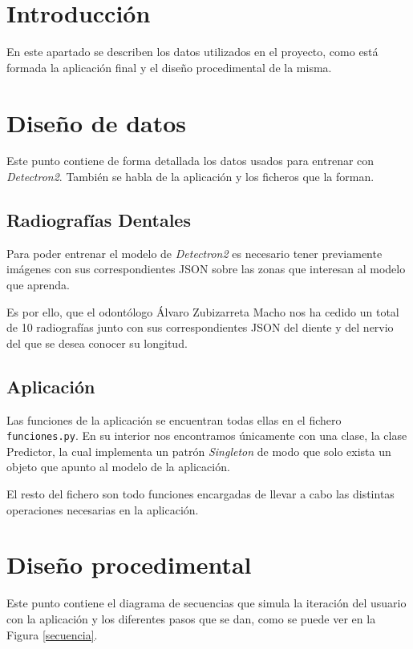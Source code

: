 
\section{Introducción}
En este apartado se describen los datos utilizados en el proyecto, como está formada la aplicación final y el diseño procedimental de la misma.

\section{Diseño de datos}
Este punto contiene de forma detallada los datos usados para entrenar con \emph{Detectron2}. También se habla de la aplicación y los ficheros que la forman.

\subsection{Radiografías Dentales}
Para poder entrenar el modelo de \emph{Detectron2} es necesario tener previamente imágenes con sus correspondientes JSON sobre las zonas que interesan al modelo que aprenda.

Es por ello, que el odontólogo Álvaro Zubizarreta Macho nos ha cedido un total de 10 radiografías junto con sus correspondientes JSON del diente y del nervio del que se desea conocer su longitud.

\subsection{Aplicación}
Las funciones de la aplicación se encuentran todas ellas en el fichero \texttt{funciones.py}. En su interior nos encontramos únicamente con una clase, la clase Predictor, la cual implementa un patrón \emph{Singleton} de modo que solo exista un objeto que apunto al modelo de la aplicación.

El resto del fichero son todo funciones encargadas de llevar a cabo las distintas operaciones necesarias en la aplicación.

\section{Diseño procedimental}
Este punto contiene el diagrama de secuencias que simula la iteración del usuario con la aplicación y los diferentes pasos que se dan, como se puede ver en la Figura \ref{secuencia}.

